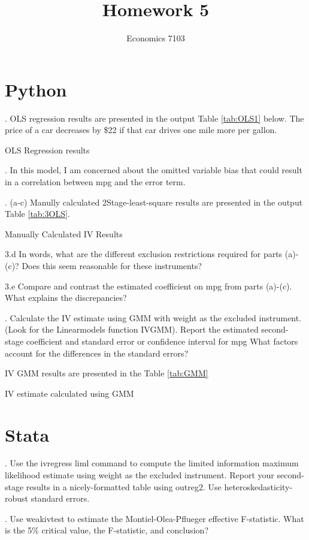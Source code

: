 \documentclass{article}
\title{Homework 5}
\author{Economics 7103}
\begin{document}
  
\maketitle

\section{Python}
. OLS regression results are presented in the output Table \ref{tab:OLS1} below. The price of a car decreases by \$22 if that car drives one mile more per gallon. 

\begin{table}[h]
    \centering
    
    \caption{OLS Regression results}
    \label{tab:OLS1}
\end{table}

. In this model, I am concerned about the omitted variable bias that could result in a correlation between mpg and the error term.

\clearpage

. (a-c) Manully calculated 2Stage-least-square results are presented in the output Table \ref{tab:3OLS}. 

\begin{table}[h]
    \centering
    
    \caption{Manually Calculated IV Results}
    \label{tab:3OLS}
\end{table}

\noindent 3.d In words, what are the different exclusion restrictions required for parts (a)-(c)? Does this seem reasonable for these instruments?


\noindent 3.e Compare and contrast the estimated coefficient on mpg from parts (a)-(c). What explains the discrepancies?

. Calculate the IV estimate using GMM with weight as the excluded instrument. (Look for the Linearmodels function IVGMM). Report the estimated second-stage coefficient and standard error or confidence interval for mpg What factors account for the differences in the standard errors?

IV GMM results are presented in the Table \ref{tab:GMM}

\begin{table}[h]
    \centering
    
    \caption{IV estimate calculated using GMM}
    \label{tab:GMM}
\end{table}


\section{Stata}

. Use the ivregress liml command to compute the limited information maximum likelihood estimate using weight as the excluded instrument. Report your second-stage results in a nicely-formatted table using outreg2. Use heteroskedasticity-robust standard errors.


. Use weakivtest to estimate the Montiel-Olea-Pflueger effective F-statistic. What is the 5\% critical value, the F-statistic, and conclusion?
\end{document}
